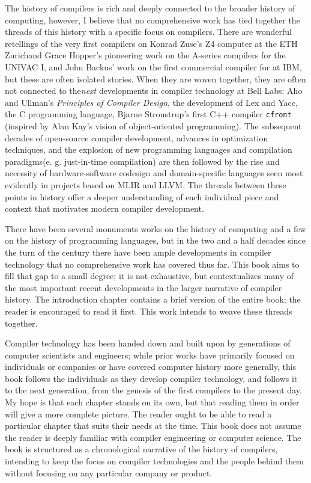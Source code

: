 
The history of compilers is rich and deeply connected to the broader history of 
computing, however, I believe that no comprehensive work has tied together the 
threads of this history with a specific focus on compilers. There are wonderful 
retellings of the very first compilers on Konrad Zuse's Z4 computer at the ETH 
Zurichand Grace Hopper's pioneering work on the A-series compilers for the 
UNIVAC I, and John Backus' work on the first commercial compiler for \FTN{}
 at IBM, but these are often isolated stories. When they are woven together, they 
are often not connected to the\textit{next}
 developments in compiler technology at Bell Labs: Aho and Ullman's 
\textit{Principles of Compiler Design}, the development of Lex and Yacc, the C 
programming language, Bjarne Stroustrup's first C++ compiler \texttt{cfront}
(inspired by Alan Kay's vision of object-oriented programming). The subsequent 
decades of open-source compiler development, advances in optimization 
techniques, and the explosion of new programming languages and compilation 
paradigms(e. g. just-in-time compilation) are then followed by the rise and 
necessity of hardware-software codesign and domain-specific languages seen most 
evidently in projects based on MLIR and LLVM. The threads between these points 
in history offer a deeper understanding of each individual piece and context 
that motivates modern compiler development.

There have been several 
monuments works on the history of computing and a few on the history of 
programming languages, but in the two and a half decades since the turn of the 
century there have been ample developments in compiler technology that no 
comprehensive work has covered thus far. This book aims to fill that gap to a 
small degree; it is not exhaustive, but contextualizes many of the most 
important recent developments in the larger narrative of compiler history.
The introduction chapter contains a brief version of the entire book; the 
reader is encouraged to read it first. This work intends to weave these threads 
together. 

Compiler technology has been handed down and built upon by generations 
of computer scientists and engineers; while prior works have primarily focused 
on individuals or companies or have covered computer history more generally, this 
book follows the individuals as they develop compiler technology, and follows it 
to the next generation, from the genesis of the first compilers to the present 
day. My hope is that each chapter stands on its own, but that reading them in 
order will give a more complete picture. The reader ought to be able to read a 
particular chapter that suits their needs at the time. This book does not assume 
the reader is deeply familiar with compiler engineering or computer science. The 
book is structured as a chronological narrative of the history of 
compilers, intending to keep the focus on compiler technologies and the people 
behind them without focusing on any particular company or product.

